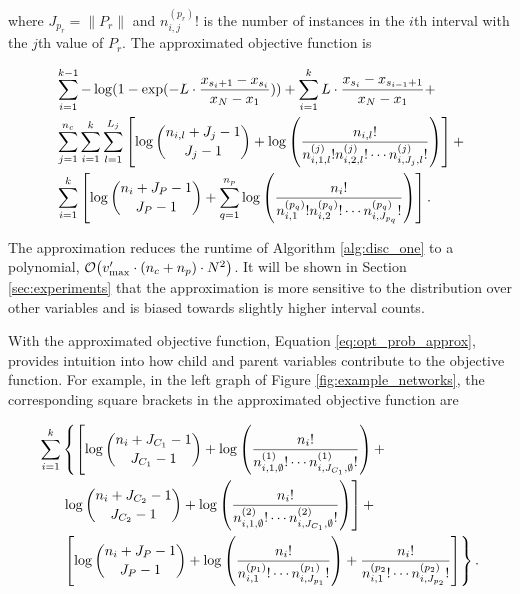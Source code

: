 \noindent
where $J_{p_r} = \| P_r\|$ and ${n^{(p_r)}_{i,j} !}$ is the number of instances in the $i$th interval with the $j$th value of $P_r$.
The approximated objective function is

\begin{small}
\begin{equation}
\begin{aligned}
\label{eq:opt_prob_approx}
& \sum_{i=1}^{k-1} - \log(1 - {\exp(- L \cdot {{x_{s_i+1} - x_{s_i}}\over{x_N - x_1}})}) +  \sum_{i=1}^{k} L \cdot {{x_{s_{i}} - x_{s_{i-1} + 1}}\over{x_N - x_1}} +\\
&  \sum_{j=1}^{n_c} \sum_{i=1}^{k}  \sum_{l=1}^{L_j} \left[  \log{{n_{i,l} + J_j - 1}\choose{J_j-1}} + \log \left( { {{n_{i,l}}!}\over{ {n^{(j)}_{i,1,l} !} {n^{(j)}_{i,2,l} !} \cdots {n^{(j)}_{i,J_j,l} !}} } \right) \right] + \\
& \sum_{i=1}^k \left[  \log {{n_{i} + J_P - 1}\choose{J_P-1}} + \sum_{q=1}^{n_p} \log \left( { {{{n}_i}!}\over{ {n^{(p_q)}_{i,1} !} {n^{(p_q)}_{i,2} !} \cdots {n^{(p_q)}_{i,J_{p_q}} !}}} \right) \right]\text{.}
\end{aligned}
\end{equation}
\end{small}

The approximation reduces the runtime of Algorithm \ref{alg:disc_one} to a polynomial, $\bigo\paren{ {v'_\text{max}} \cdot (n_c + n_p) \cdot N^2}$.
It will be shown in Section \ref{sec:experiments} that the approximation is more sensitive to the distribution over other variables and is biased towards slightly higher interval counts.

With the approximated objective function, Equation \ref{eq:opt_prob_approx}, provides intuition into how child and parent variables contribute to the objective function.
For example, in the left graph of Figure \ref{fig:example_networks}, the corresponding square brackets in the approximated objective function are

\begin{small}
\begin{equation}
\begin{aligned}
\label{eq:example_approx}
 \sum_{i=1}^k & \left\lbrace   \left[ \log{{n_{i} + J_{C_1} - 1}\choose{J_{C_1}-1}} + \log \left(  {{{n_i}!} \over { {n^{(1)}_{i,1,\emptyset} !} \cdots {n^{(1)}_{i,J_{C_1},\emptyset} !}} }  \right)  +  \right. \right.\\
& \left.  \log{{n_{i} + J_{C_2} - 1}\choose{J_{C_2}-1}} + \log \left(  {{{n_i}!} \over { {n^{(2)}_{i,1,\emptyset} !} \cdots {n^{(2)}_{i,J_{C_1},\emptyset} !}} }  \right)  \right] + \\
&  \left. \left[  \log {{n_{i} + J_P - 1}\choose{J_P-1}} +  \log \left( { {{{n}_i}!}\over{ {n^{(p_1)}_{i,1} !}\cdots {n^{(p_1)}_{i,J_{p_1}} !}}} \right) +{ {{{n}_i}!}\over{ {n^{(p_2}_{i,1} !}\cdots {n^{(p_2)}_{i,J_{p_2}} !}}}  \right] \right\rbrace \text{.}
\end{aligned}
\end{equation}
\end{small}

